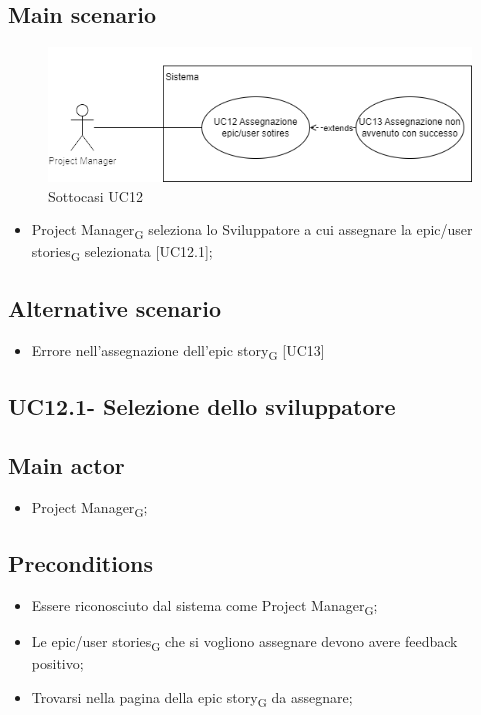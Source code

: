 \documentclass{article}
\begin{document}
    \subsection*{Main scenario}
        \begin{figure}[h]
          \centering
          \includegraphics{./imgUML/UC12-zoom.png}
          \caption{Sottocasi UC12}
          \label{fig:UC12_sottocasi}
        \end{figure}
        
        \begin{itemize}
            \item Project Manager\textsubscript{G} seleziona lo Sviluppatore a cui assegnare la epic/user stories\textsubscript{G} selezionata [UC12.1];
        \end{itemize}
        
    \subsection*{Alternative scenario}
        \begin{itemize}
            \item Errore nell'assegnazione dell'epic story\textsubscript{G} [UC13]
        \end{itemize}    
        
    \subsection{UC12.1- Selezione dello sviluppatore}
        \subsection*{Main actor}
    \begin{itemize}
        \item Project Manager\textsubscript{G};
    \end{itemize}
    
    \subsection*{Preconditions}
        \begin{itemize}
            \item Essere riconosciuto dal sistema come Project Manager\textsubscript{G};
            \item Le epic/user stories\textsubscript{G} che si vogliono assegnare devono avere feedback positivo;
            \item Trovarsi nella pagina della epic story\textsubscript{G} da assegnare;
        \end{itemize}
        
\end{document}
